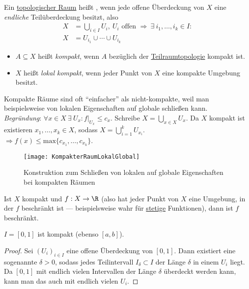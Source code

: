 \begin{definition}\label{def:kompakt}
  Ein \hyperref[def:topologie]{topologischer Raum} heißt , wenn jede offene Überdeckung von \( X \) eine \emph{endliche} Teilüberdeckung besitzt, also
  \begin{align*}
    X &= \bigcup_{i \in I} U_i, \ U_i \text{ offen } \Rightarrow \ \exists \ i_1, \dots, i_k \in I : \\
    X &= U_{i_1} \cup \cdots \cup U_{i_k}
  \end{align*}
  \begin{itemize}
    \item \( A \subseteq X \) heißt \emph{kompakt}, wenn \( A \) bezüglich der \hyperref[def:teilraumtopologie]{Teilraumtopologie} kompakt ist.
    \item \( X \) heißt \emph{lokal kompakt}, wenn jeder Punkt von \( X \) eine kompakte Umgebung besitzt.
  \end{itemize}
\end{definition}

\begin{remark}
  Kompakte Räume sind oft ``einfacher'' als nicht-kompakte, weil man beispielsweise von lokalen Eigenschaften auf globale schließen kann. \\
  \emph{Begründung}: \( \forall x \in X \ \exists \ U_x : f\vert_{U_x} \leq c_x \). Schreibe \( X = \bigcup_{x \in X}U_x \). Da \( X \) kompakt ist existieren \( x_1, \dots, x_k \in X \), sodass \( X = \bigcup_{i=1}^k U_{x_i} \). \\
  \( \Rightarrow f(x) \leq \text{max}\{ c_{x_1}, \dots, c_{x_k} \} \).
  \begin{figure}[H]
    \texttt{[image: KompakterRaumLokalGlobal]}
    \caption{Konstruktion zum Schließen von lokalen auf globale Eigenschaften bei kompakten Räumen}
  \end{figure}
\end{remark}

\begin{example}\label{bsp:beschraenkt}
  Ist \( X \) kompakt und \( f: X \to \R \)  (also hat jeder Punkt von \( X \) eine Umgebung, in der \( f \) beschränkt ist --- beispielsweise wahr für \hyperref[def:stetig]{stetige} Funktionen), dann ist \( f \) beschränkt.
\end{example}

\begin{example}
  \( I = [0,1] \) ist kompakt (ebenso \( [a,b] \)).
  \begin{proof}
    Sei \( {(U_i)}_{i \in I} \) eine offene Überdeckung von \( [0,1] \). Dann existiert eine sogenannte \label{def:lebesgueZahl} \( \delta > 0 \), sodass jedes Teilintervall \( I_\delta \subset I \) der Länge \( \delta \) in einem \( U_i \) liegt. Da \( [0,1] \) mit endlich vielen Intervallen der Länge \( \delta \) überdeckt werden kann, kann man das auch mit endlich vielen \( U_i \).
  \end{proof}
\end{example}

